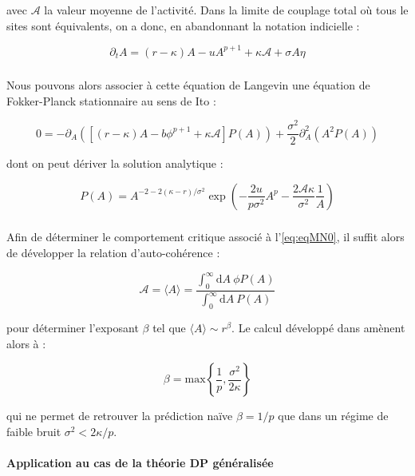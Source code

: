 \noindent avec $\mathcal{A}$ la valeur moyenne de l'activité. Dans la limite de couplage total où tous le sites sont équivalents, on a donc, en abandonnant la notation indicielle :

\begin{equation}
	\partial_t A = (r-\kappa)A - uA^{p+1} + \kappa\mathcal{A} + \sigma A \eta
	\label{eq:eqMN0}
\end{equation}

\subparagraph{}Nous pouvons alors associer à cette équation de Langevin une équation de Fokker-Planck stationnaire au sens de Ito :

\begin{equation}
    0 = -\partial_A\left( \left[(r-\kappa)A - b\phi^{p+1}+\kappa\mathcal{A} \right] P(A)\right) + \frac{\sigma^2}{2}\partial_A^2\left( A^2 P(A)\right)
\end{equation}

\noindent dont on peut dériver la solution analytique :

\begin{equation}
    P(A) = A^{-2-2(\kappa-r)/\sigma^2}\exp\left( -\frac{2u}{p\sigma^2}A^p - \frac{2\mathcal{A} \kappa}{\sigma^2}\frac{1}{A} \right)
\end{equation}

\subparagraph{}Afin de déterminer le comportement critique associé à l'\autoref{eq:eqMN0}, il suffit alors de développer la relation d'auto-cohérence :

\begin{equation}
    \mathcal{A} = \langle A \rangle = \frac{\int_0^\infty\mathrm{d}A~\phi P(A)}{\int_0^\infty\mathrm{d}A~P(A)}
\end{equation}

\noindent pour déterminer l'exposant $\beta$ tel que $\langle A \rangle \sim r^\beta$. Le calcul développé dans \cite{munoz_multiplicative_2003, munoz_multiplicative_2003} amènent alors à :

\begin{equation}
	\beta = \mathrm{max}\left\{ \frac{1}{p}, \frac{\sigma^2}{2\kappa}\right\}
\end{equation}

\noindent qui ne permet de retrouver la prédiction naïve $\beta = 1/p$ que dans un régime de faible bruit $\sigma^2 < 2\kappa/p$.

\paragraph{Application au cas de la théorie DP généralisée}

